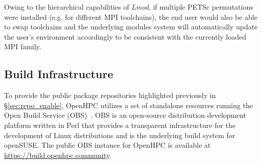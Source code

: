 \documentclass{sig-alternate-05-2015}
\begin{document}
\newpage
Owing to the hierarchical capabilities of {\em Lmod}, if multiple PETSc
permutations were installed (e.g. for different MPI toolchains), the end user
would also be able to swap toolchains and the underlying modules system will
automatically update the user's environment accordingly to be consistent with
the currently loaded MPI family.





\subsection{Build Infrastructure} \label{sec:build_infra}

To provide the public package repositories highlighted previously in
\S\ref{sec:repo_enable}, OpenHPC utilizes a set of standalone resources
running the Open Build Service (OBS)~\cite{OBS_url}.  OBS is an open-source
distribution development platform written in Perl that provides a transparent
infrastructure for the development of Linux distributions and is the underlying
build system for openSUSE.  The public OBS instance for OpenHPC is available at
\url{https://build.openhpc.community}.
\end{document}
